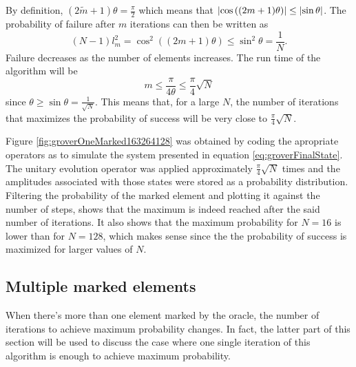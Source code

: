 \documentclass[../../dissertation.tex]{subfiles}
\begin{document}
By definition, $(2\widetilde{m}+1)\theta = \frac{\pi}{2}$ which means that
$\abs{\cos{((2m+1)}\theta)} \leq \abs{\sin{\theta}}$. The probability of
failure after $m$ iterations can then be written as
\begin{equation}
	(N-1)l_m^2 = \cos^2{((2m+1)\theta)} \leq \sin^2\theta = \frac{1}{N}.
\end{equation}
Failure decreases as the number of elements increases. The run time of the algorithm will be
\begin{equation}
	m \leq \frac{\pi}{4\theta} \leq \frac{\pi}{4}\sqrt{N}
\end{equation}
since $\theta \geq \sin\theta = \frac{1}{\sqrt{N}}$. This means that, for a
large $N$, the number of iterations that maximizes the probability of success
will be very close to $\frac{\pi}{4}\sqrt{N}$.\par 
Figure \ref{fig:groverOneMarked163264128} was obtained by coding the apropriate
operators as to simulate the system presented in equation
\ref{eq:groverFinalState}. 
The unitary evolution operator was applied approximately
$\frac{\pi}{4}\sqrt{N}$ times and the amplitudes associated with those states
were stored as a probability distribution. Filtering the probability of the
marked element and plotting it against the number of steps, shows that the
maximum is indeed reached after the said number of iterations. It also shows
that the maximum probability for $N=16$ is lower than for $N=128$, which makes
sense since the the probability of success is maximized for larger values of
$N$.

\subsection{Multiple marked elements}
When there's more than one element marked by the oracle, the number of
iterations to achieve maximum probability changes. In fact, the latter part of
this section will be used to discuss the case where one single iteration of
this algorithm is enough to achieve maximum probability.\par 
\end{document}
